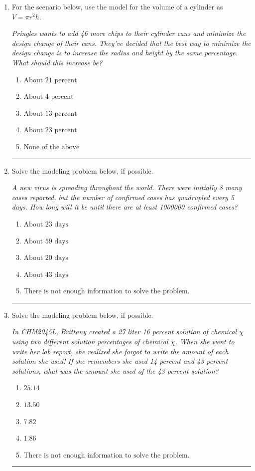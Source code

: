 \documentclass[14pt]{extbook}
\newcommand{\litem}[1]{\item#1\hspace*{-1cm}\rule{\textwidth}{0.4pt}}
\begin{document}
\begin{enumerate}
{\begin{enumerate}[label=\Alph*.]
\end{enumerate} }
\litem{
For the scenario below, use the model for the volume of a cylinder as $V = \pi r^2 h$.
\begin{center}
    \textit{ Pringles wants to add 46 \text{percent} more chips to their cylinder cans and minimize the design change of their cans. They've decided that the best way to minimize the design change is to increase the radius and height by the same percentage. What should this increase be? }
\end{center}
\begin{enumerate}[label=\Alph*.]
\item \( \text{About } 21 \text{ percent} \)
\item \( \text{About } 4 \text{ percent} \)
\item \( \text{About } 13 \text{ percent} \)
\item \( \text{About } 23 \text{ percent} \)
\item \( \text{None of the above} \)

\end{enumerate} }
\litem{
Solve the modeling problem below, if possible.
\begin{center}
    \textit{ A new virus is spreading throughout the world. There were initially 8 many cases reported, but the number of confirmed cases has quadrupled every 5 days. How long will it be until there are at least 1000000 confirmed cases? }
\end{center}
\begin{enumerate}[label=\Alph*.]
\item \( \text{About } 23 \text{ days} \)
\item \( \text{About } 59 \text{ days} \)
\item \( \text{About } 20 \text{ days} \)
\item \( \text{About } 43 \text{ days} \)
\item \( \text{There is not enough information to solve the problem.} \)

\end{enumerate} }
\litem{
Solve the modeling problem below, if possible.
\begin{center}
    \textit{ In CHM2045L, Brittany created a 27 liter 16 percent solution of chemical $\chi$ using two different solution percentages of chemical $\chi$. When she went to write her lab report, she realized she forgot to write the amount of each solution she used! If she remembers she used 14 percent and 43 percent solutions, what was the amount she used of the 43 percent solution? }
\end{center}
\begin{enumerate}[label=\Alph*.]
\item \( 25.14 \)
\item \( 13.50 \)
\item \( 7.82 \)
\item \( 1.86 \)
\item \( \text{There is not enough information to solve the problem.} \)


\end{enumerate}}
\end{enumerate}
\end{document}
